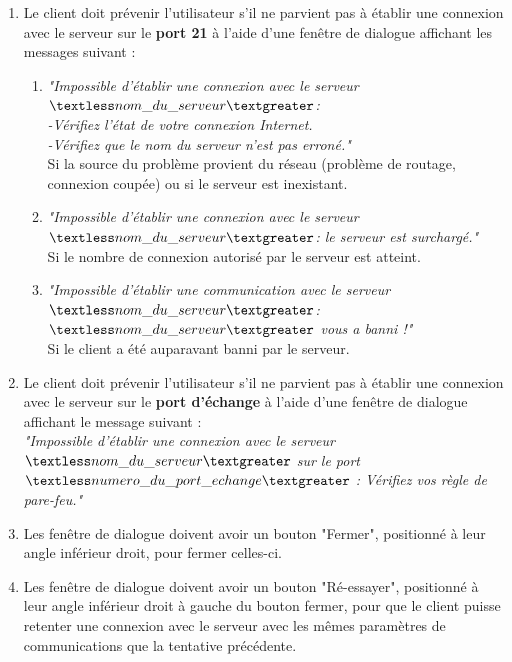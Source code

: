\documentclass[10pt,a4paper]{report}
\begin{document}
		\begin{enumerate}
			\item Le client doit prévenir l'utilisateur s'il ne parvient pas à établir une connexion avec le serveur sur le \textbf{port 21} à l'aide d'une fenêtre de dialogue affichant les messages suivant : 

			\begin{enumerate}
				\item \textit{"Impossible d'établir une connexion avec le serveur $\textless nom\_du\_serveur\textgreater$:\\
-Vérifiez l'état de votre connexion Internet.\\
-Vérifiez que le nom du serveur n'est pas erroné."\\}
Si la source du problème provient du réseau (problème de routage, connexion coupée) ou si le serveur est inexistant.

				\item \textit{"Impossible d'établir une connexion avec le serveur $\textless nom\_du\_serveur\textgreater$: le serveur est surchargé."\\}
Si le nombre de connexion autorisé par le serveur est atteint.

				\item \textit{"Impossible d'établir une communication avec le serveur $\textless nom\_du\_serveur\textgreater$:\\
$\textless nom\_du\_serveur\textgreater$ vous a banni !"\\}
Si le client a été auparavant banni par le serveur. 
			\end{enumerate}

			\item Le client doit prévenir l'utilisateur s'il ne parvient pas à établir une connexion avec le serveur sur le \textbf{port d'échange} à l'aide d'une fenêtre de dialogue affichant le message suivant : \\
\textit{"Impossible d'établir une connexion avec le serveur $\textless nom\_du\_serveur\textgreater$ sur le port $\textless numero\_du\_port\_echange\textgreater$ : Vérifiez vos règle de pare-feu."\\}

			\item Les fenêtre de dialogue doivent avoir un bouton "Fermer", positionné à leur angle inférieur droit, pour fermer celles-ci.

			\item Les fenêtre de dialogue doivent avoir un bouton "Ré-essayer", positionné à leur angle inférieur droit à gauche du bouton fermer, pour que le client puisse retenter une connexion avec le serveur avec les mêmes paramètres de communications que la tentative précédente.

		\end{enumerate}
		
\end{document}
